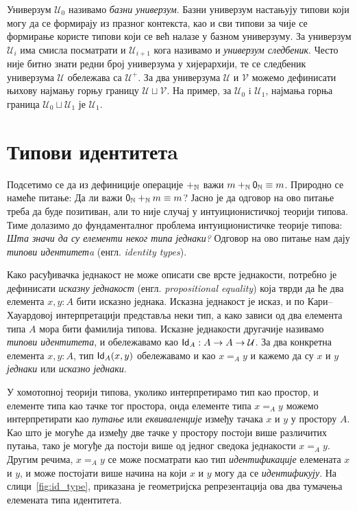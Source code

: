 \documentclass[12pt,oneside]{memoir}
\begin{document}
Универзум $\mathcal{U}_0$ називамо \emph{базни универзум}. Базни универзум настањују типови који могу да се формирају из празног контекста, као и сви типови за чије се формирање користе типови који се већ налазе у базном универзуму. За универзум $\mathcal{U}_i$ има смисла посматрати и $\mathcal{U}_{i+1}$ кога називамо и \emph{универзум следбеник}. Често није битно знати редни број универзума у хијерархији, те се следбеник универзума $\mathcal{U}$ обележава са $\mathcal{U}^{+}$. За два универзума $\mathcal{U}$ и $\mathcal{V}$ можемо дефинисати њихову најмању горњу границу $\mathcal{U} \sqcup \mathcal{V}$. На пример, за $\mathcal{U}_0$ i $\mathcal{U}_1$, најмања горња граница $\mathcal{U}_0 \sqcup \mathcal{U}_1$ је $\mathcal{U}_1$.

\section{Типови идентитетa}
\label{sec:id}

Подсетимо се да из дефиниције операције $+_{\mathbb{N}}$ важи $m +_{\mathbb{N}} \mathsf{0}_\mathbb{N} \equiv m$. Природно се намеће питање: Да ли важи $\mathsf{0}_\mathbb{N} +_{\mathbb{N}} m \equiv m$? Јасно је да одговор на ово питање треба да буде позитиван, али то није случај у интуиционистичкој теорији типова. Тиме долазимо до фундаменталног проблема интуиционистичке теорије типова: \emph{Шта значи да су елементи неког типа једнаки?} Одговор на ово питање нам дају \emph{типови идентитетa} (енгл. \emph{identity types}).

Како расуђивачка једнакост не може описати све врсте једнакости, потребно је дефинисати \emph{исказну једнакост} (енгл. \emph{propositional equality}) која тврди да ће два елемента $x, y : A$ бити исказно једнака. Исказна једнакост је исказ, и по Кари--Хауардовој интерпретацији представља неки тип, а како зависи од два елемента типа $A$ мора бити фамилија типова. Исказне једнакости другачије називамо \emph{типови идентитета}, и обележавамо као $\mathsf{Id}_{A} : A \to A \to \mathcal{U}$. За два конкретна елемента $x, y : A$, тип $\mathsf{Id}_{A}(x, y)$ обележавамо и као $x =_A y$ и кажемо да су $x$ и $y$ \emph{једнаки} или \emph{исказно једнаки}.

У хомотопној теорији типова, уколико интерпретирамо тип као простор, и елементе типа као тачке тог простора, онда елементе типа $x =_A y$ можемо интерпретирати као \emph{путање} или \emph{еквиваленције} између тачака $x$ и $y$ у простору $A$. Као што је могуће да између две тачке у простору постоји више различитих путања, тако је могуђе да постоји више од једног сведока једнакости $x =_A y$. Другим речима, $x =_A y$ се може посматрати као тип \emph{идентификације} елемената $x$ и $y$, и може постојати више начина на који $x$ и $y$ могу да се \emph{идентификују}. На слици~\ref{fig:id_type}, приказана је геометријска репрезентација ова два тумачења елемената типа идентитета.
\end{document}
